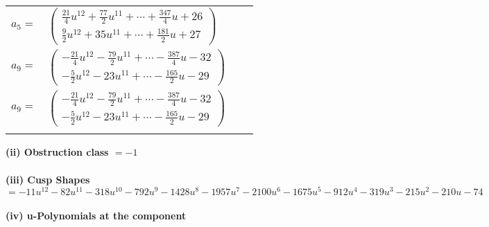 \documentclass[1p]{elsarticle_modified}
\theoremstyle{definition}
\begin{document}
\begin{tabular}{m{7pt} m{180pt} m{7pt} m{180pt} }
\flushright $a_{5}=$&$\begin{pmatrix}\frac{21}{4} u^{12}+\frac{77}{2} u^{11}+\cdots+\frac{347}{4} u+26\\\frac{9}{2} u^{12}+35 u^{11}+\cdots+\frac{181}{2} u+27\end{pmatrix}$ \\
\flushright $a_{9}=$&$\begin{pmatrix}-\frac{21}{4} u^{12}-\frac{79}{2} u^{11}+\cdots-\frac{387}{4} u-32\\-\frac{5}{2} u^{12}-23 u^{11}+\cdots-\frac{165}{2} u-29\end{pmatrix}$\\ \flushright $a_{9}=$&$\begin{pmatrix}-\frac{21}{4} u^{12}-\frac{79}{2} u^{11}+\cdots-\frac{387}{4} u-32\\-\frac{5}{2} u^{12}-23 u^{11}+\cdots-\frac{165}{2} u-29\end{pmatrix}$\\&\end{tabular}
\flushleft \textbf{(ii) Obstruction class $= -1$}\\~\\
\flushleft \textbf{(iii) Cusp Shapes $= -11 u^{12}-82 u^{11}-318 u^{10}-792 u^9-1428 u^8-1957 u^7-2100 u^6-1675 u^5-912 u^4-319 u^3-215 u^2-210 u-74$}\\~\\
\newpage\renewcommand{\arraystretch}{1}
\flushleft \textbf{(iv) u-Polynomials at the component}\newline \\
\end{document}
